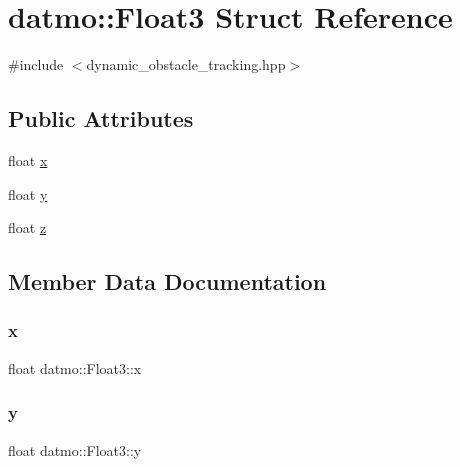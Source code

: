 \hypertarget{structdatmo_1_1Float3}{}\section{datmo\+:\+:Float3 Struct Reference}
\label{structdatmo_1_1Float3}


{\ttfamily \#include $<$dynamic\+\_\+obstacle\+\_\+tracking.\+hpp$>$}

\subsection*{Public Attributes}
\begin{DoxyCompactItemize}
\item 
float \hyperlink{structdatmo_1_1Float3_a7aa3368518f608e392ddd9b0bc439d43}{x}
\item 
float \hyperlink{structdatmo_1_1Float3_ae2fd4b65d40ad8b5db904de01c1758a1}{y}
\item 
float \hyperlink{structdatmo_1_1Float3_ab2367e74700bd7f2c4ba295a135f1561}{z}
\end{DoxyCompactItemize}


\subsection{Member Data Documentation}
\mbox{\label{structdatmo_1_1Float3_a7aa3368518f608e392ddd9b0bc439d43}} 
\subsubsection{\texorpdfstring{x}{x}}
{\footnotesize\ttfamily float datmo\+::\+Float3\+::x}

\mbox{\label{structdatmo_1_1Float3_ae2fd4b65d40ad8b5db904de01c1758a1}} 
\subsubsection{\texorpdfstring{y}{y}}
{\footnotesize\ttfamily float datmo\+::\+Float3\+::y}

\mbox{\label{structdatmo_1_1Float3_ab2367e74700bd7f2c4ba295a135f1561}} 
